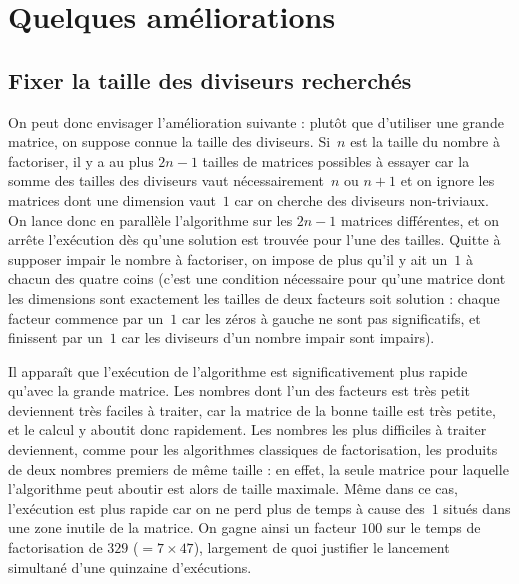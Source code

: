 \documentclass[11pt, openany, a4paper]{article}
\begin{document}


\section*{Quelques améliorations}

\subsection*{Fixer la taille des diviseurs recherchés}

On peut donc envisager l'amélioration suivante : plutôt que d'utiliser une grande matrice, on suppose connue la taille des diviseurs. Si~$n$ est la taille du nombre à factoriser, il y a au plus $2n-1$ tailles de matrices possibles à essayer car la somme des tailles des diviseurs vaut nécessairement~$n$ ou $n+1$ et on ignore les matrices dont une dimension vaut~$1$ car on cherche des diviseurs non-triviaux. On lance donc en parallèle l'algorithme sur les $2n-1$ matrices différentes, et on arrête l'exécution dès qu'une solution est trouvée pour l'une des tailles. Quitte à supposer impair le nombre à factoriser, on impose de plus qu'il y ait un~$1$ à chacun des quatre coins (c'est une condition nécessaire pour qu'une matrice dont les dimensions sont exactement les tailles de deux facteurs soit solution : chaque facteur commence par un~$1$ car les zéros à gauche ne sont pas significatifs, et finissent par un~$1$ car les diviseurs d'un nombre impair sont impairs). 

\medskip
Il apparaît que l'exécution de l'algorithme est significativement plus rapide qu'avec la grande matrice. Les nombres dont l'un des facteurs est très petit deviennent très faciles à traiter, car la matrice de la bonne taille est très petite, et le calcul y aboutit donc rapidement. Les nombres les plus difficiles à traiter deviennent, comme pour les algorithmes classiques de factorisation, les produits de deux nombres premiers de même taille : en effet, la seule matrice pour laquelle l'algorithme peut aboutir est alors de taille maximale. Même dans ce cas, l'exécution est plus rapide car on ne perd plus de temps à cause des~$1$ situés dans une zone inutile de la matrice. On gagne ainsi un facteur $100$ sur le temps de factorisation de $329$ ($ =7\times 47$), largement de quoi justifier le lancement simultané d'une quinzaine d'exécutions. %

\end{document}
